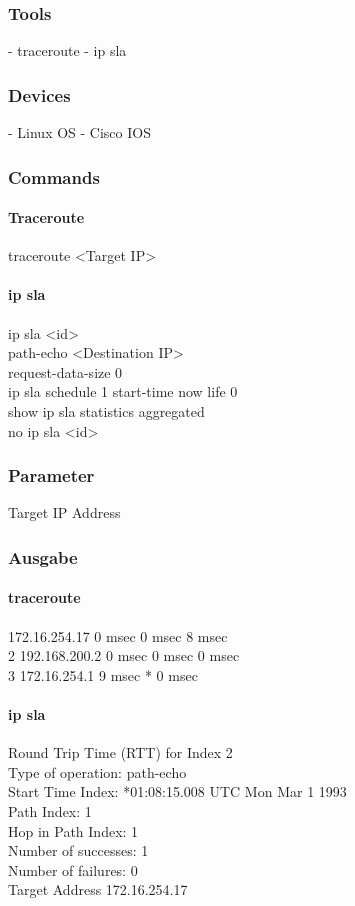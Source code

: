 \documentclass[a4,12pt]{scrartcl}
\begin{document}
\subsubsection{Tools}
- traceroute
- ip sla
\subsubsection{Devices}
- Linux OS
- Cisco IOS
\subsubsection{Commands}
\paragraph{Traceroute}\hfill

\noindent traceroute <Target IP>
\paragraph{ip sla}\hfill

\noindent ip sla <id>\\
path-echo <Destination IP>\\
request-data-size 0\\
ip sla schedule 1 start-time now life 0\\
show ip sla statistics aggregated\\
no ip sla <id>
\subsubsection{Parameter}
Target IP Address
\subsubsection{Ausgabe}
\newline
\paragraph{traceroute}\hfill

   172.16.254.17 0 msec 0 msec 8 msec\\
  2 192.168.200.2 0 msec 0 msec 0 msec\\
  3 172.16.254.1 9 msec *  0 msec
\paragraph{ip sla}\hfill

\noindent Round Trip Time (RTT) for       Index 2\\
Type of operation: path-echo\\
Start Time Index: *01:08:15.008 UTC Mon Mar 1 1993\\
Path Index: 1\\
Hop in Path Index: 1\\
Number of successes: 1\\
Number of failures: 0\\
Target Address 172.16.254.17\\
\end{document}

